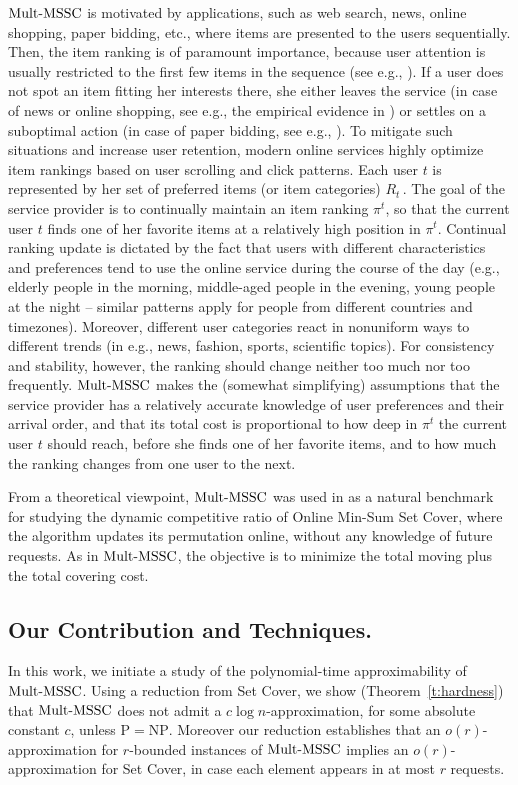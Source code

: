 %
$\mathrm{Mult}\text{-}\mathrm{MSSC}$ is motivated by applications, such as web search, news, online shopping, paper bidding, etc., where items are presented to the users sequentially. Then, the item ranking is of paramount importance, because user attention is usually restricted to the first few items in the sequence (see e.g., \cite{StreeterGK09,CKMS01,FSR18,PT18}). If a user does not spot an item fitting her interests there, she either leaves the service (in case of news or online shopping, see e.g., the empirical evidence in \cite{DGMM20}) or settles on a suboptimal action (in case of paper bidding, see e.g., \cite{GP13}). To mitigate such situations and increase user retention, modern online services highly optimize item rankings based on user scrolling and click patterns. Each user $t$ is represented by her set of preferred items (or item categories) $R_t$\,. The goal of the service provider is to continually maintain an item ranking $\pi^t$, so that the current user $t$ finds one of her favorite items at a relatively high position in $\pi^t$. Continual ranking update is dictated by the fact that users with different characteristics and preferences tend to use the online service during the course of the day (e.g., elderly people in the morning, middle-aged people in the evening, young people at the night -- similar patterns apply for people from different countries and timezones). Moreover, different user categories react in nonuniform ways to different trends (in e.g., news, fashion, sports, scientific topics). For consistency and stability, however, the ranking should change neither too much nor too frequently. $\mathrm{Mult}\text{-}\mathrm{MSSC}$ makes the (somewhat simplifying) assumptions that the service provider has a relatively accurate knowledge of user preferences and their arrival order, and that its total cost is proportional to how deep in $\pi^t$ the current user $t$ should reach, before she finds one of her favorite items, and to how much the ranking changes from one user to the next. 

From a theoretical viewpoint, $\mathrm{Mult}\text{-}\mathrm{MSSC}$ was used in \cite{FKKSV20} as a natural benchmark for studying the dynamic competitive ratio of Online Min-Sum Set Cover, where the algorithm updates its permutation online, without any knowledge of future requests. As in $\mathrm{Mult}\text{-}\mathrm{MSSC}$, the objective is to minimize the total moving plus the total covering cost. 

\subsection{Our Contribution and Techniques.}
%
In this work, we initiate a study of the polynomial-time approximability of $\mathrm{Mult}\text{-}\mathrm{MSSC}$. Using a reduction from Set Cover, we show (Theorem~\ref{t:hardness}) that $\mathrm{Mult}\text{-}\mathrm{MSSC}$ does not admit a $c\log n$-approximation, for some absolute constant $c$, unless $\mathrm{P}=\mathrm{NP}$. Moreover our reduction establishes that an $o(r)$-approximation for $r$-bounded instances of $\mathrm{Mult}\text{-}\mathrm{MSSC}$ implies an $o(r)$-approximation for Set Cover, in case each element appears in at most $r$ requests. 

